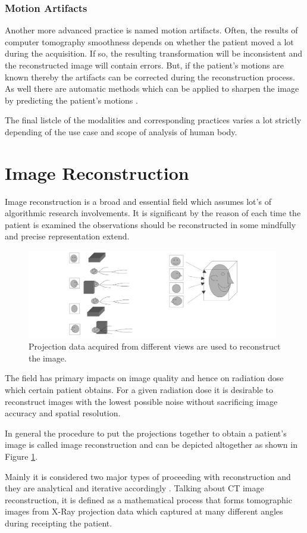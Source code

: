 \subsubsection{Motion Artifacts}
Another more advanced practice is named motion artifacts. Often, the results of computer tomography smoothness depends on whether the patient moved a lot during the acquisition. If so, the resulting transformation will be inconsistent and the reconstructed image will contain errors. But, if the patient's motions are known thereby the artifacts can be corrected during the reconstruction process. As well there are automatic methods which can be applied to sharpen the image by predicting the patient's motions \cite{Lossau2019}.

The final listcle of the modalities and corresponding practices varies a lot strictly depending of the use case and scope of analysis of human body.

\section{Image Reconstruction}
Image reconstruction is a broad and essential field which assumes lot's of algorithmic research involvements. It is significant by the reason of each time the patient is examined the observations should be reconstructed in some mindfully and precise representation extend. 

\begin{figure}[h!]
    \centering \includegraphics[width=11cm]{images/image_reconstruction.png}
    \caption {Projection data acquired from different views are used to reconstruct the image.}
    \label{fig:image_reconstruction}
\end{figure}

The field has primary impacts on image quality and hence on radiation dose which certain patient obtains. For a given radiation dose it is desirable to reconstruct images with the lowest possible noise without sacrificing image accuracy and spatial resolution.

In general the procedure to put the projections together to obtain a patient's image is called image reconstruction and can be depicted altogether as shown in Figure \ref{fig:image_reconstruction}.

Mainly it is considered two major types of proceeding with reconstruction and they are analytical and iterative accordingly \cite{Singh2020}. Talking about CT image reconstruction, it is defined as a mathematical process that forms tomographic images from X-Ray projection data which captured at many different angles during receipting the patient.






